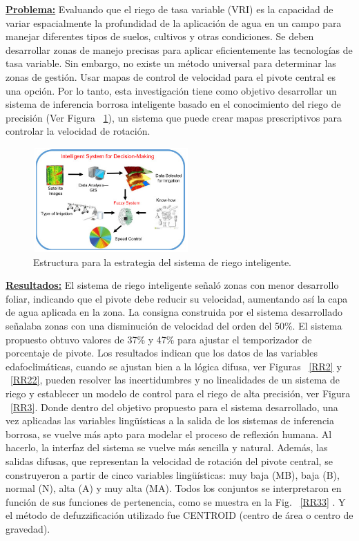 \documentclass[10pt,conference]{IEEEtran}
\begin{document}
\begin{enumerate}
\textbf{\underline{Problema:}} 
Evaluando que el riego de tasa variable (VRI) es la capacidad de variar espacialmente la profundidad de la aplicación de agua en un campo para manejar diferentes tipos de suelos, cultivos y otras condiciones. Se deben desarrollar zonas de manejo precisas para aplicar eficientemente las tecnologías de tasa variable. Sin embargo, no existe un método universal para determinar las zonas de gestión. Usar mapas de control de velocidad para el pivote central es una opción. Por lo tanto, esta investigación tiene como objetivo desarrollar un sistema de inferencia borrosa inteligente basado en el conocimiento del riego de precisión (Ver Figura ~\ref{RR1}), un sistema que puede crear mapas prescriptivos para controlar la velocidad de rotación.
    \begin{figure}[H]
    \begin{center}
    \includegraphics[width=6cm,height=4cm]{figuras/RR1.PNG}
    \caption{Estructura para la estrategia del sistema de riego inteligente.}
    \label{RR1} 
    \end{center}
    \end{figure}
\textbf{\underline{Resultados:}} 
El sistema de riego inteligente señaló zonas con menor desarrollo foliar, indicando que el pivote debe reducir su velocidad, aumentando así la capa de agua aplicada en la zona. La consigna construida por el sistema desarrollado señalaba zonas con una disminución de velocidad del orden del 50\%. El sistema propuesto obtuvo valores de 37\% y 47\% para ajustar el temporizador de porcentaje de pivote. Los resultados indican que los datos de las variables edafoclimáticas, cuando se ajustan bien a la lógica difusa, ver Figuras ~\ref{RR2} y ~\ref{RR22}, pueden resolver las incertidumbres y no linealidades de un sistema de riego y establecer un modelo de control para el riego de alta precisión, ver Figura ~\ref{RR3}. Donde dentro del objetivo propuesto para el sistema desarrollado, una vez aplicadas las variables lingüísticas a la salida de los sistemas de inferencia borrosa, se vuelve más apto para modelar el proceso de reflexión humana. Al hacerlo, la interfaz del sistema se vuelve más sencilla y natural. Además, las salidas difusas, que representan la velocidad de rotación del pivote central, se construyeron a partir de cinco variables lingüísticas: muy baja (MB), baja (B), normal (N), alta (A) y muy alta (MA). Todos los conjuntos se interpretaron en función de sus funciones de pertenencia, como se muestra en la Fig. ~\ref{RR33} . Y el método de defuzzificación utilizado fue CENTROID (centro de área o centro de gravedad). 


\end{enumerate}
\end{document}
